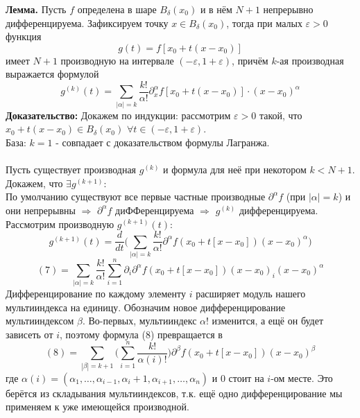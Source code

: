 \documentclass[book, 11pt]{report}
\begin{document}
        \par{\textbf{Лемма.} Пусть $f$ определена в шаре $B_\delta(x_0)$ и в нём $N+1$ непрерывно дифференцируема. Зафиксируем точку $x\in B_\delta(x_0)$, тогда при малых $\varepsilon>0$ функция
        \begin{equation}
            g(t)=f[x_0+t(x-x_0)]
        \end{equation}
        имеет $N+1$ производную на интервале $(-\varepsilon,1+\varepsilon)$, причём $k$-ая производная выражается формулой
        \begin{equation}
            g^{(k)}(t)=\sum_{|\alpha|=k}\frac{k!}{\alpha!}\partial_x^{\alpha}f[x_0+t(x-x_0)]\cdot(x-x_0)^{\alpha}
        \end{equation}
        \textbf{Доказательство: }Докажем по индукции: рассмотрим $\varepsilon>0$ такой, что $x_0+t(x-x_0)\in B_\delta(x_0)$ $\forall t\in(-\varepsilon,1+\varepsilon)$. \\
        База: $k=1$ - совпадает с доказательством формулы Лагранжа. \\
        \\
        Пусть существует производная $g^{(k)}$ и формула для неё при некотором $k<N+1$. Докажем, что $\exists g^{(k+1)}$: \\
        По умолчанию существуют все первые частные производные $\partial^{\alpha}f$ (при $|\alpha|=k$) и они непрерывны $\Rightarrow$ $\partial^{\alpha}f$ диФФеренцируема $\Rightarrow$ $g^{(k)}$ дифференцируема. Рассмотрим производную $g^{(k+1)}(t)$:
        \begin{equation}
            g^{(k+1)}(t)=\frac{d}{dt}\bigg(\sum_{|\alpha|=k}\frac{k!}{\alpha!}\partial^{\alpha}f(x_0+t[x-x_0])(x-x_0)^{\alpha}\bigg)
        \end{equation}
        \begin{equation}
            (7)=\sum_{|\alpha|=k}\frac{k!}{\alpha!}\sum_{i=1}^n\partial_i\partial^\alpha f(x_0+t[x-x_0])(x-x_0)_i(x-x_0)^{\alpha}
        \end{equation}
        Дифференцирование по каждому элементу $i$ расширяет модуль нашего мультииндекса на единицу. Обозначим новое дифференцирование мультииндексом $\beta$. Во-первых, мультииндекс $\alpha!$ изменится, а ещё он будет зависеть от $i$, поэтому формула (8) превращается в 
        \begin{equation}
	       (8)=\sum_{|\beta|=k+1}\bigg(\sum_{i=1}^n\frac{k!}{\alpha(i)!}\bigg)\partial^{\beta}f(x_0+t[x-x_0])(x-x_0)^{\beta}
        \end{equation}
        где $\alpha(i)=(\alpha_1,\ldots,\alpha_{i-1},\alpha_i+1,\alpha_{i+1},\ldots,\alpha_n)$ и 0 стоит на $i$-ом месте. Это берётся из складывания мультииндексов, т.к. ещё одно дифференцирование мы применяем к уже имеющейся производной. \\
}
\end{document}
